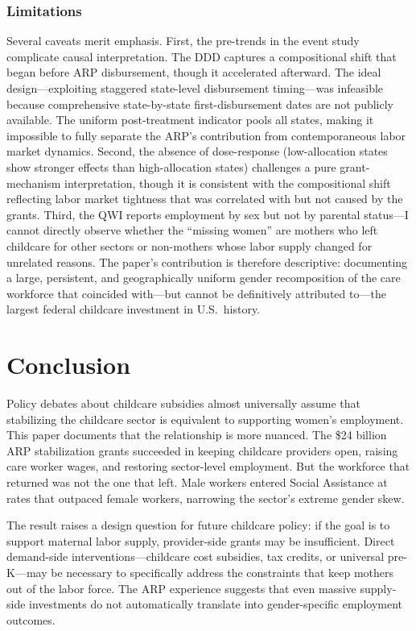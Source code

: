 \documentclass[12pt]{article}
\begin{document}
\subsubsection*{Limitations} Several caveats merit emphasis. First, the pre-trends in the event study complicate causal interpretation. The DDD captures a compositional shift that began before ARP disbursement, though it accelerated afterward. The ideal design---exploiting staggered state-level disbursement timing---was infeasible because comprehensive state-by-state first-disbursement dates are not publicly available. The uniform post-treatment indicator pools all states, making it impossible to fully separate the ARP's contribution from contemporaneous labor market dynamics. Second, the absence of dose-response (low-allocation states show stronger effects than high-allocation states) challenges a pure grant-mechanism interpretation, though it is consistent with the compositional shift reflecting labor market tightness that was correlated with but not caused by the grants. Third, the QWI reports employment by sex but not by parental status---I cannot directly observe whether the ``missing women'' are mothers who left childcare for other sectors or non-mothers whose labor supply changed for unrelated reasons. The paper's contribution is therefore descriptive: documenting a large, persistent, and geographically uniform gender recomposition of the care workforce that coincided with---but cannot be definitively attributed to---the largest federal childcare investment in U.S.\ history.

\section{Conclusion}

Policy debates about childcare subsidies almost universally assume that stabilizing the childcare sector is equivalent to supporting women's employment. This paper documents that the relationship is more nuanced. The \$24 billion ARP stabilization grants succeeded in keeping childcare providers open, raising care worker wages, and restoring sector-level employment. But the workforce that returned was not the one that left. Male workers entered Social Assistance at rates that outpaced female workers, narrowing the sector's extreme gender skew.

The result raises a design question for future childcare policy: if the goal is to support maternal labor supply, provider-side grants may be insufficient. Direct demand-side interventions---childcare cost subsidies, tax credits, or universal pre-K---may be necessary to specifically address the constraints that keep mothers out of the labor force. The ARP experience suggests that even massive supply-side investments do not automatically translate into gender-specific employment outcomes.
\end{document}
